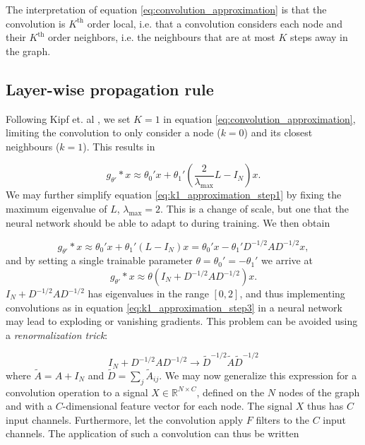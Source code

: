 The interpretation of equation \eqref{eq:convolution_approximation} is that the convolution is $K^{\text{th}}$ order local, i.e. that a convolution considers each node and their $K^{\text{th}}$ order neighbors, i.e. the neighbours that are at most $K$ steps away in the graph. 


\subsection{Layer-wise propagation rule}

Following Kipf et. al \cite{kipf_semi_supervised}, we set $K=1$ in equation \eqref{eq:convolution_approximation}, limiting the convolution to only consider a node ($k=0$) and its closest neighbours ($k=1$). This results in 

\begin{equation}
    g_{\theta'} * x \approx \theta_0' x + \theta_1' \left( \frac{2}{\lambda_{\text{max}}}L - I_N \right)x.
    \label{eq:k1_approximation_step1}
\end{equation}
We may further simplify equation \eqref{eq:k1_approximation_step1} by fixing the maximum eigenvalue of $L$, $\lambda_{\text{max}} = 2$. This is a change of scale, but one that the neural network should be able to adapt to during training. We then obtain

\begin{equation}
    g_{\theta'} * x \approx \theta_0' x + \theta_1' \left(L - I_N \right)x = \theta_0' x - \theta_1' D^{-1/2}AD^{-1/2}x ,
    \label{eq:k1_approximation_step2}
\end{equation}
and by setting a single trainable parameter $\theta = \theta_0' = -\theta_1'$ we arrive at 
\begin{equation}
    g_{\theta'} * x \approx \theta \left(I_N + D^{-1/2}AD^{-1/2} \right)x. 
    \label{eq:k1_approximation_step3}
\end{equation}
$I_N + D^{-1/2}AD^{-1/2}$ has eigenvalues in the range $[0, 2]$, and thus implementing convolutions as in equation \eqref{eq:k1_approximation_step3} in a neural network may lead to exploding or vanishing gradients. This problem can be avoided using a \textit{renormalization trick}:

\begin{equation}
    I_N + D^{-1/2}AD^{-1/2} \rightarrow \tilde{D}^{-1/2} \tilde{A} \tilde{D}^{-1/2}
    \label{eq:renormalization_trick}
\end{equation}
where $\tilde{A} = A + I_N$ and $\tilde{D} = \sum_j \tilde{A}_{ij}$.
We may now generalize this expression for a convolution operation to a signal $X \in \mathbb{R}^{N \times C}$, defined on the $N$ nodes of the graph and with a $C$-dimensional feature vector for each node. The signal $X$ thus has $C$ input channels. Furthermore, let the convolution apply $F$ filters to the $C$ input channels. The application of such a convolution can thus be written

